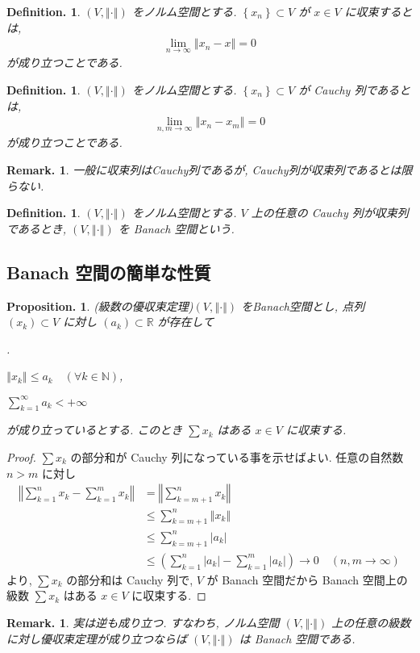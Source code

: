 \documentclass[openany, a4paper, oneside]{jsbook}
\newcounter{enum2}
\renewenvironment{enumerate}{%
\begin{list}%
{%
\arabic{enum2}.\ \,%
}%
{%
\usecounter{enum2}
\setlength{\itemindent}{0pt}%
\setlength{\leftmargin}{15pt}%
\setlength{\rightmargin}{0pt}%
\setlength{\labelsep}{0pt}%
\setlength{\labelwidth}{6pt}%
\setlength{\itemsep}{0pt}%
\setlength{\parsep}{0pt}%
\setlength{\listparindent}{0pt}%
}
}{%
\end{list}%
}
\theoremstyle{break}
\theoremstyle{breakdefn}
\newtheorem{prop}[thm]{Proposition.}
\newtheorem{defn}[thm]{Definition.}
\newtheorem{rem}[thm]{Remark.}
\newcommand{\abs}[1]{\left|#1\right|}
\newcommand{\norm}[1]{\left\Vert#1\right\Vert}
\newcommand{\rbk}[1]{\left (#1\right)}
\newcommand{\cbk}[1]{\left\{#1\right\}}
\newcommand{\bbN}{\mathbb{N}}
\newcommand{\bbR}{\mathbb{R}}
\begin{document}
\begin{defn}
 $(V, \norm{\cdot})$ をノルム空間とする.
 $\cbk{x_n} \subset V$ が $x \in V$ に収束するとは,
 \begin{align*}
  \lim_{n \to \infty} \norm{x_n - x}
  =
  0
 \end{align*}
が成り立つことである.
\end{defn}
\begin{defn}
 $(V, \norm{\cdot})$ をノルム空間とする.
 $\cbk{x_n} \subset V$ が Cauchy 列であるとは,
  \begin{align*}
   \lim_{n, m \to \infty} \norm{x_n - x_m}
   =
   0
  \end{align*}
 が成り立つことである.
\end{defn}
\begin{rem}
一般に収束列はCauchy列であるが, Cauchy列が収束列であるとは限らない.
\end{rem}
\begin{defn}
 $(V, \norm{\cdot})$ をノルム空間とする.
 $V$ 上の任意の Cauchy 列が収束列であるとき, $(V, \norm{\cdot})$ を Banach 空間という.
\end{defn}
\subsection{Banach 空間の簡単な性質}


\begin{prop}(級数の優収束定理)\label{introductory-study-function-spaces1}
 $(V, \norm{\cdot})$ をBanach空間とし, 点列 $\rbk{x_k} \subset V$ に対し $\rbk{a_k} \subset \bbR$ が存在して
\begin{enumerate}
\item $\norm{x_k} \leq a_k \quad (\forall k \in \bbN)$,
\item $\sum_{k=1}^{\infty} a_k < +\infty$
\end{enumerate}
 が成り立っているとする.
 このとき $\sum x_k$ はある $x \in V$ に収束する.
\end{prop}
\begin{proof}
$\sum x_k$ の部分和が Cauchy 列になっている事を示せばよい.
任意の自然数 $n > m$ に対し
\begin{align*}
 \norm{\sum_{k=1}^{n} x_k - \sum_{k=1}^{m} x_k}
 &=
 \norm{\sum_{k=m+1}^{n} x_k} \\
 &\leq
 \sum_{k=m+1}^{n} \norm{x_k} \\
 &\leq
 \sum_{k=m+1}^{n} \abs{a_k} \\
 &\leq
 \rbk{\sum_{k=1}^{n} \abs{a_k} - \sum_{k=1}^{m} \abs{a_k}} \to 0 \quad (n, m \to \infty)
\end{align*}
より, $\sum x_k$ の部分和は Cauchy 列で, $V$ が Banach 空間だから
Banach 空間上の級数 $\sum x_k$ はある $x\in V$ に収束する.
\end{proof}
\begin{rem}
実は逆も成り立つ.
すなわち, ノルム空間 $(V, \norm{\cdot})$ 上の任意の級数に対し優収束定理が成り立つならば $(V, \norm{\cdot})$ は Banach 空間である.
\end{rem}
\end{document}
